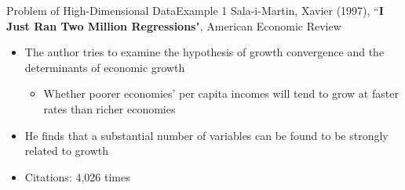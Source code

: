 \documentclass[hyperref={pdfpagelabels=false}]{beamer}
\begin{document}
	
	
	
	
	
	
	
	
	
	\begin{frame}{Problem of High-Dimensional Data}{Example 1}
		Sala-i-Martin, Xavier (1997), ``\textbf{I Just Ran Two Million Regressions}", American Economic Review
		
					\vspace{0.2cm}
		\begin{itemize}	
			\item The author tries to examine the hypothesis of growth convergence and the determinants of economic growth 
			\vspace{0.2cm}
			\begin{itemize}
				\item Whether poorer economies' per capita incomes will tend to grow at faster rates than richer economies
			\end{itemize}
			\vspace{0.2cm}
			\item He finds that a substantial number of variables can be found to be strongly related to growth
			\vspace{0.2cm}
			\item Citations: 4,026 times
			
		\end{itemize}
	\end{frame}
	
	
	
\end{document}
